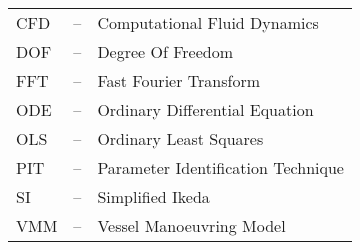 
\begin{tabular}{ l c l }
CFD & -- & Computational Fluid Dynamics\\
DOF & -- & Degree Of Freedom\\
FFT & -- & Fast Fourier Transform\\
ODE & -- & Ordinary Differential Equation\\
OLS & -- & Ordinary Least Squares\\
PIT & -- & Parameter Identification Technique\\
SI  & -- & Simplified Ikeda\\
VMM & -- & Vessel Manoeuvring Model\\

\end{tabular}
